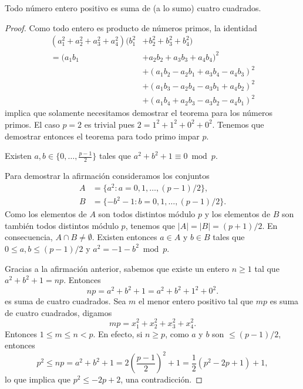 \begin{theorem}[Lagrange]
	\label{thm:Lagrange}
	Todo número entero positivo es suma de (a lo sumo) cuatro cuadrados.	
\end{theorem}

\begin{proof}
	Como todo entero es producto de números primos, 
	la identidad 
	\begin{equation}
		\begin{aligned}
			\label{eq:Euler}
			(a_1^2+a_2^2+a_3^2+a_4^2)(b_1^2&+b_2^2+b_3^2+b_4^2)\\
			=(a_1 b_1 &+ a_2 b_2 + a_3 b_3 + a_4 b_4)^2\\
			&+(a_1 b_2 - a_2 b_1 + a_3 b_4 - a_4 b_3)^2\\
			&+(a_1 b_3 - a_2 b_4 - a_3 b_1 + a_4 b_2)^2\\
			&+(a_1 b_4 + a_2 b_3 - a_3 b_2 - a_4 b_1)^2
		\end{aligned}
	\end{equation}
	implica que solamente necesitamos demostrar el teorema para los números
	primos. El caso $p=2$ es trivial pues $2=1^2+1^2+0^2+0^2$. Tenemos que
	demostrar entonces el teorema para todo primo impar $p$. 

	\begin{claim}
		Existen $a,b\in\{0,\dots,\frac{p-1}{2}\}$ tales que
		$a^2+b^2+1\equiv0\bmod{p}$. 
	\end{claim}

	Para demostrar la afirmación consideramos los conjuntos 
	\begin{align*}
		A&=\{a^2:a=0,1,\dots,(p-1)/2\},\\
		B&=\{-b^2-1:b=0,1,\dots,(p-1)/2\}.
	\end{align*}
	Como los elementos de $A$ son todos distintos módulo $p$ y los elementos de
	$B$ son también todos distintos módulo $p$, tenemos que $|A|=|B|=(p+1)/2$.
	En consecuencia, $A\cap B\ne\emptyset$. Existen entonces $a\in A$ y $b\in B$
	tales que $0\leq a,b\leq (p-1)/2$ y $a^2=-1-b^2\bmod p$.

	\medskip
	Gracias a la afirmación anterior, sabemos que existe un entero $n\geq1$ tal
	que $a^2+b^2+1=np$. Entonces
	\[
		np=a^2+b^2+1=a^2+b^2+1^2+0^2.
	\]
	es suma de cuatro cuadrados. Sea $m$ el menor entero positivo tal que $mp$
	es suma de cuatro cuadrados, digamos
	\[
		mp=x_1^2+x_2^2+x_3^2+x_4^2.
	\]
	Entonces $1\leq m\leq n<p$. En efecto, si $n\geq p$, como $a$ y $b$ son
	$\leq(p-1)/2$, entonces 
	\[
	p^2\leq np=a^2+b^2+1=2\left(\frac{p-1}{2}\right)^2+1=\frac12(p^2-2p+1)+1,
	\]
	lo que implica que
	$p^2\leq -2p+2$, una contradicción.


\end{proof}
